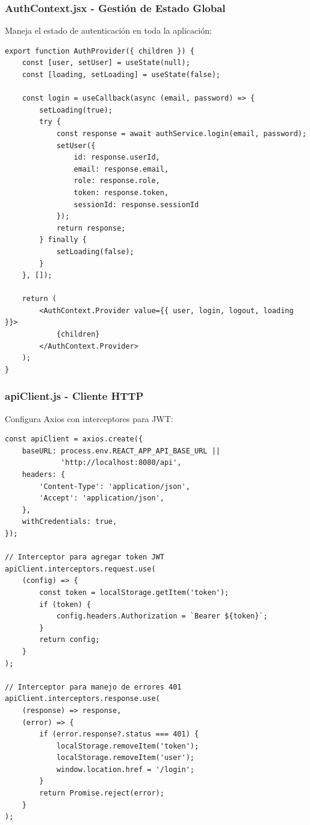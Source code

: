 \documentclass[11pt,a4paper]{article}
\begin{document}
\subsubsection{AuthContext.jsx - Gestión de Estado Global}

Maneja el estado de autenticación en toda la aplicación:

\begin{verbatim}
export function AuthProvider({ children }) {
    const [user, setUser] = useState(null);
    const [loading, setLoading] = useState(false);

    const login = useCallback(async (email, password) => {
        setLoading(true);
        try {
            const response = await authService.login(email, password);
            setUser({
                id: response.userId,
                email: response.email,
                role: response.role,
                token: response.token,
                sessionId: response.sessionId
            });
            return response;
        } finally {
            setLoading(false);
        }
    }, []);

    return (
        <AuthContext.Provider value={{ user, login, logout, loading }}>
            {children}
        </AuthContext.Provider>
    );
}
\end{verbatim}

\subsubsection{apiClient.js - Cliente HTTP}

Configura Axios con interceptores para JWT:

\begin{verbatim}
const apiClient = axios.create({
    baseURL: process.env.REACT_APP_API_BASE_URL || 
             'http://localhost:8080/api',
    headers: {
        'Content-Type': 'application/json',
        'Accept': 'application/json',
    },
    withCredentials: true,
});

// Interceptor para agregar token JWT
apiClient.interceptors.request.use(
    (config) => {
        const token = localStorage.getItem('token');
        if (token) {
            config.headers.Authorization = `Bearer ${token}`;
        }
        return config;
    }
);

// Interceptor para manejo de errores 401
apiClient.interceptors.response.use(
    (response) => response,
    (error) => {
        if (error.response?.status === 401) {
            localStorage.removeItem('token');
            localStorage.removeItem('user');
            window.location.href = '/login';
        }
        return Promise.reject(error);
    }
);
\end{verbatim}
\end{document}
